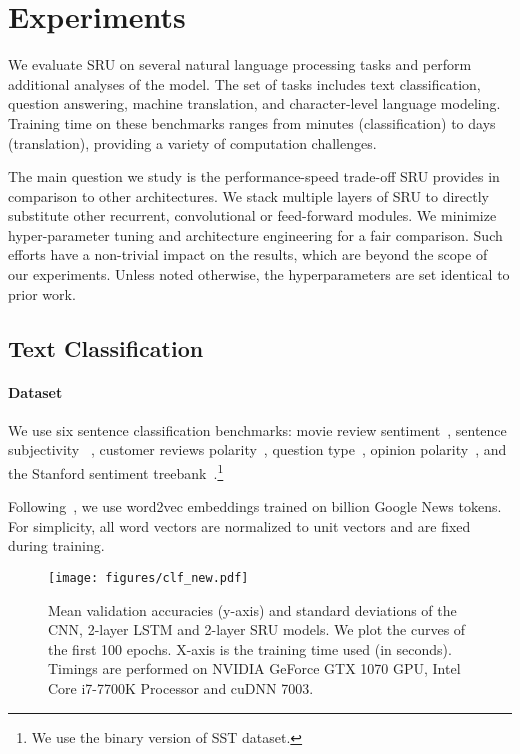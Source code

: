 \documentclass[11pt,a4paper]{article}
\begin{document}
\section{Experiments}
\label{sec:exp}

We evaluate SRU on several natural language processing tasks and perform additional analyses of the model.
The set of tasks includes text classification, question answering, machine translation, and character-level language modeling. 
Training time on these benchmarks ranges from  minutes (classification) to  days (translation), providing a variety of computation challenges.




The main question we study is the performance-speed trade-off SRU provides in comparison to other architectures. 
We stack multiple layers of SRU to directly substitute other recurrent, convolutional or feed-forward modules. We minimize hyper-parameter tuning and architecture engineering for a fair comparison. Such efforts have a non-trivial impact on the results, which are beyond the scope of our experiments. 
Unless noted otherwise, the hyperparameters are set identical to prior work. 


\subsection{Text Classification}
\label{sec:exp:class}

\paragraph{Dataset} We use six sentence classification benchmarks: movie review sentiment~\citep[MR;][]{pang2005seeing}, sentence subjectivity ~\citep[SUBJ;][]{pang2004sentimental}, customer reviews polarity~\citep[CR;][]{hu2004mining}, question type~\citep[TREC;][]{li2002learning}, opinion polarity~\citep[MPQA;][]{wiebe2005annotating}, and the Stanford sentiment treebank~\citep[SST;][]{socher2013sentiment}.\footnote{We use the binary version of SST dataset.}


Following~\citet{Kim14}, we use word2vec embeddings trained on  billion Google News tokens. 
For simplicity, all word vectors are normalized to unit vectors and are fixed during training.

\begin{figure*}[!th!]
\centering
\texttt{[image: figures/clf\_new.pdf]}
\vspace{-0.05in}
\caption{\label{fig:clf}Mean validation accuracies (y-axis) and standard deviations of the CNN, 2-layer LSTM and 2-layer SRU models. We plot the curves of the first 100 epochs. X-axis is the training time used (in seconds). Timings are performed on NVIDIA GeForce GTX 1070 GPU, Intel Core i7-7700K Processor and cuDNN 7003.}
\end{figure*}
\end{document}
